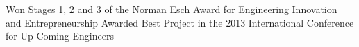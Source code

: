 %
%
%


\begin{scholarship}
			{Won Stages 1, 2 and 3 of the Norman Esch Award for Engineering Innovation and Entrepreneurship}			
			{Awarded Best Project in the 2013 International Conference for Up-Coming Engineers}			
\end{scholarship}